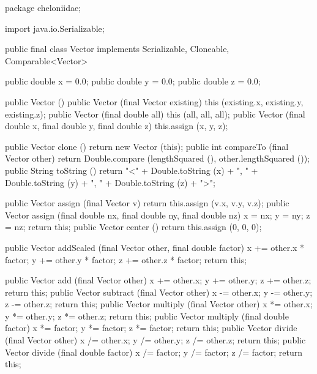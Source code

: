 \documentclass{report}
\begin{document}
\begin{javacode}
package cheloniidae;

import java.io.Serializable;

public final class Vector implements Serializable, Cloneable, Comparable<Vector> {
  public double x = 0.0;
  public double y = 0.0;
  public double z = 0.0;

  public Vector ()                                               {}
  public Vector (final Vector existing)                          {this (existing.x, existing.y, existing.z);}
  public Vector (final double all)                               {this (all, all, all);}
  public Vector (final double x, final double y, final double z) {this.assign (x, y, z);}

  public Vector clone     ()                   {return new Vector (this);}
  public int    compareTo (final Vector other) {return Double.compare (lengthSquared (), other.lengthSquared ());}
  public String toString  ()                   {return "<" + Double.toString (x) + ", " +
                                                             Double.toString (y) + ", " +
                                                             Double.toString (z) + ">";}

  public Vector assign (final Vector v)                                    {return this.assign (v.x, v.y, v.z);}
  public Vector assign (final double nx, final double ny, final double nz) {x = nx; y = ny; z = nz; return this;}
  public Vector center ()                                                  {return this.assign (0, 0, 0);}

  public Vector addScaled (final Vector other, final double factor) {x += other.x * factor;
                                                                     y += other.y * factor;
                                                                     z += other.z * factor;
                                                                     return this;}

  public Vector add      (final Vector other)  {x += other.x; y += other.y; z += other.z; return this;}
  public Vector subtract (final Vector other)  {x -= other.x; y -= other.y; z -= other.z; return this;}
  public Vector multiply (final Vector other)  {x *= other.x; y *= other.y; z *= other.z; return this;}
  public Vector multiply (final double factor) {x *= factor;  y *= factor;  z *= factor;  return this;}
  public Vector divide   (final Vector other)  {x /= other.x; y /= other.y; z /= other.z; return this;}
  public Vector divide   (final double factor) {x /= factor;  y /= factor;  z /= factor;  return this;}

}
\end{javacode}
\end{document}
